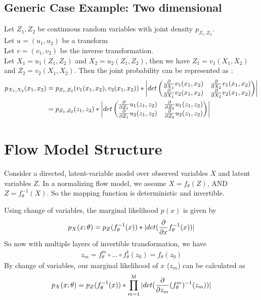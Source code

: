 \subsection{Generic Case Example: Two dimensional} 
Let $Z_1, Z_2$ be continuous random variables with joint density $p_{Z_1, Z_2}$. \\
Let $u = (u_1, u_2)$ be a transform\\
Let $v = (v_1, v_2)$ be the inverse transformation. \\
Let $X_1 = u_1(Z_1, Z_2)$ and $X_2 = u_2(Z_1, Z_2)$, then we have $Z_1 = v_1(X_1, X_2)$ and $Z_2 = v_2(X_1, X_2)$. Then the joint probability can be represented as : 
    \begin{align*}
        p_{X_1, X_2}(x_1, x_2)
        & = p_{Z_1, Z_2}(v_1(x_1, x_2), v_2(x_1, x_2)) * \left | det \left( 
            \begin{matrix}
                \frac{\partial}{\partial X_1} v_1(x_1, x_2) & \frac{\partial}{\partial X_2} v_1(x_1, x_2) \\
                \frac{\partial}{\partial X_1} v_2(x_1, x_2) & \frac{\partial}{\partial X_2} v_2(x_1, x_2) \\
            \end{matrix}
        \right) \right| \\
        & = p_{Z_1, Z_2}(z_1, z_2) * \left | det \left( 
            \begin{matrix}
                \frac{\partial}{\partial Z_1} u_1(z_1, z_2) & \frac{\partial}{\partial Z_2} u_1(z_1, z_2) \\
                \frac{\partial}{\partial Z_1} u_2(z_1, z_2) & \frac{\partial}{\partial Z_2} u_2(z_1, z_2) \\
            \end{matrix}
        \right) \right| \\
    \end{align*}


\section{Flow Model Structure} 
Consider a directed, latent-variable model over observed variables $X$ and latent variables $Z$. In a normalizing flow model, we assume $X=f_\theta(Z)$, AND $Z = f_\theta^{-1}(X)$. So the mapping function is deterministic and invertible. \\ \par

Using change of variables, the marginal likelihood $p(x)$ is given by 
    \begin{align*}
        p_X(x;\theta) = p_Z(f^{-1}_\theta(x)) * |det(\frac{\partial}{\partial x}f^{-1}_\theta(x))|
    \end{align*}
So now with multiple layers of invertible transformation, we have 
    \begin{align*}
        z_m = f_\theta^m \circ ... \circ f_\theta^1(z_0) = f_\theta(z_0)
    \end{align*}
By change of variables, our marginal likelihood of $x$ ($z_m$) can be calculated as 
    \begin{align*}
         p_X(x;\theta) = p_Z(f^{-1}_\theta(x)) * \prod_{m=1}^M |det(\frac{\partial}{\partial z_m}(f_\theta^m)^{-1}(z_m))|
    \end{align*}
    
